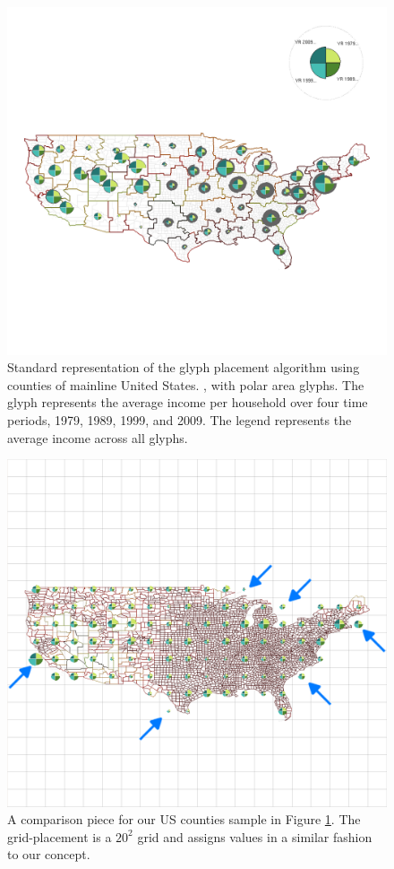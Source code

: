 \begin{figure} \centering
\includegraphics[width=1\textwidth]{images/ch5/USgridAFull.png}
\caption{Standard representation of the glyph placement algorithm using counties of mainline United States. \cite{usCounties}, with polar area glyphs. The glyph represents the average income per household over four time periods, 1979, 1989, 1999, and 2009. The legend represents the average income across all glyphs. } \label{fig:sample2}
\end{figure}
\begin{figure} \centering
\includegraphics[width=1\textwidth]{images/ch5/USgridBFull2.png}
\caption{A comparison piece for our US counties sample in Figure \ref{fig:sample2}. The grid-placement is a $20^2$ grid and assigns values in a similar fashion to our concept.}
\end{figure}
